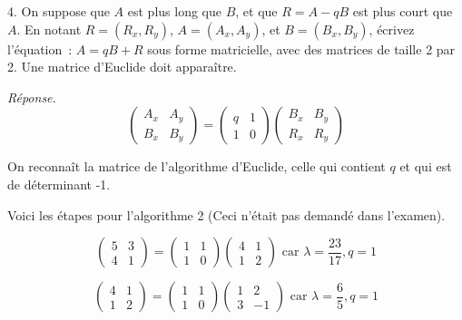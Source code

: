 \documentclass[11pt]{article}
\begin{document}
{4. On suppose  que $A$ est plus long que $B$, et
que $R=A-qB$ est plus court que $A$.
En notant $R=(R_x, R_y)$, $A=(A_x, A_y)$, et $B=(B_x, B_y)$, 
 écrivez l'équation~: $A=qB+R$ sous forme matricielle, avec des matrices de taille 2 par 2.
Une matrice d'Euclide doit apparaître.


{
\ifcorrige

\medskip

{\it  Réponse.
$$\left( \begin{array}{cc} A_x & A_y \\
B_x & B_y \end{array}\right) = \left( \begin{array}{cc} q & 1 \\
1 & 0 \end{array}\right) \left( \begin{array}{cc}  B_x & B_y \\
R_x & R_y \end{array}\right)$$

On reconnaît la matrice de l'algorithme d'Euclide, celle qui contient $q$ et qui est de déterminant -1.

Voici les étapes pour l'algorithme 2 (Ceci n'était pas demandé dans l'examen).

$$\left( \begin{array}{cc} 5 & 3 \\
4 & 1 \end{array}\right) = \left( \begin{array}{cc} 1 & 1 \\
1 & 0  \end{array}\right)  \left( \begin{array}{cc}4 & 1 \\
1 & 2  \end{array}\right) \mbox{ car } \lambda=\frac{23}{17}, q=1 $$

$$\left( \begin{array}{cc} 4 & 1 \\
1 & 2 \end{array}\right) = \left( \begin{array}{cc} 1 & 1 \\
1 & 0  \end{array}\right) \left( \begin{array}{cc} 1 & 2 \\
3 & -1  \end{array}\right) \mbox{ car } \lambda=\frac{6}{5}, q=1 $$

}}}
\end{document}
